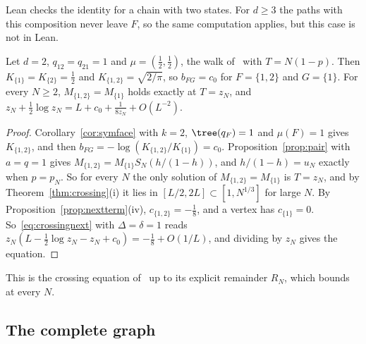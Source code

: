 Lean checks the identity for a chain with two states. For $d\ge3$ the paths with
this composition never leave $F$, so the same computation applies, but this case
is not in Lean.

\begin{corollary}\label{cor:paperA}
Let $d=2$, $q_{12}=q_{21}=1$ and $\mu=(\frac12,\frac12)$, the walk of~\cite{paperA} with
$T=N(1-p)$. Then $K_{\{1\}}=K_{\{2\}}=\frac12$ and $K_{\{1,2\}}=\sqrt{2/\pi}$, so
$b_{FG}=c_0$ for $F=\{1,2\}$ and $G=\{1\}$. For every $N\ge2$, $M_{\{1,2\}}=M_{\{1\}}$ holds
exactly at $T=z_N$, and $z_N+\frac12\log z_N=L+c_0+\frac1{8z_N}+O(L^{-2})$.
\end{corollary}

\begin{proof}
Corollary~\ref{cor:symface} with $k=2$, $\tree(q_F)=1$ and $\mu(F)=1$ gives $K_{\{1,2\}}$, and
then $b_{FG}=-\log(K_{\{1,2\}}/K_{\{1\}})=c_0$. Proposition~\ref{prop:pair} with $a=q=1$ gives
$M_{\{1,2\}}=M_{\{1\}}S_N(h/(1-h))$, and $h/(1-h)=u_N$ exactly when $p=p_N$. So for every $N$
the only solution of $M_{\{1,2\}}=M_{\{1\}}$ is $T=z_N$, and by Theorem~\ref{thm:crossing}(i) it lies in
$[L/2,2L]\subset[1,N^{1/3}]$ for large $N$. By Proposition~\ref{prop:nextterm}(iv),
$c_{\{1,2\}}=-\frac18$, and a vertex has $c_{\{1\}}=0$. So~\eqref{eq:crossingnext} with
$\Delta=\delta=1$ reads $z_N(L-\frac12\log z_N-z_N+c_0)=-\frac18+O(1/L)$, and dividing by
$z_N$ gives the equation.
\end{proof}

This is the crossing equation of~\cite{paperA} up to its explicit remainder $R_N$, which
\cite{paperA} bounds at every $N$.

\subsection{The complete graph}\label{sec:completegraph}

